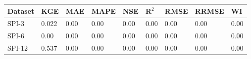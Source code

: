 \begin{tabular}{lllllllll}
\toprule
Dataset & KGE & MAE & MAPE & NSE & R$^2$ & RMSE & RRMSE & WI \\
\midrule
 SPI-3 & 0.022 & 0.00 & 0.00 & 0.00 & 0.00 & 0.00 & 0.00 & 0.00 \\
 SPI-6 & 0.00 & 0.00 & 0.00 & 0.00 & 0.00 & 0.00 & 0.00 & 0.00 \\
SPI-12 & 0.537 & 0.00 & 0.00 & 0.00 & 0.00 & 0.00 & 0.00 & 0.00 \\
\bottomrule
\end{tabular}
